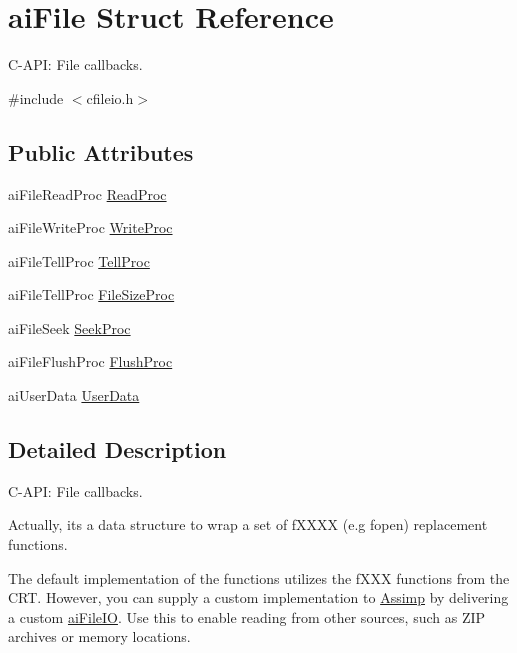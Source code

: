 \hypertarget{structai_file}{}\section{ai\+File Struct Reference}
\label{structai_file}


C-\/\+A\+PI\+: File callbacks.  




{\ttfamily \#include $<$cfileio.\+h$>$}

\subsection*{Public Attributes}
\begin{DoxyCompactItemize}
\item 
ai\+File\+Read\+Proc \hyperlink{structai_file_a52287e81ca67b9d43cc1ce6142f781fa}{Read\+Proc}
\item 
ai\+File\+Write\+Proc \hyperlink{structai_file_ab9fca3a62e34a33592c13a6f31db7d1d}{Write\+Proc}
\item 
ai\+File\+Tell\+Proc \hyperlink{structai_file_aaf2d88a3b2fcbdacf51119658283d27e}{Tell\+Proc}
\item 
ai\+File\+Tell\+Proc \hyperlink{structai_file_aff2fff8c0458e7ec71f7de217c3a3033}{File\+Size\+Proc}
\item 
ai\+File\+Seek \hyperlink{structai_file_a7a07b499be4ad433669246479a4d4ad2}{Seek\+Proc}
\item 
ai\+File\+Flush\+Proc \hyperlink{structai_file_a1102d28d1c0be68ffed20476669bdb0d}{Flush\+Proc}
\item 
ai\+User\+Data \hyperlink{structai_file_aec528fa18f4755fe4f28d604fde28aad}{User\+Data}
\end{DoxyCompactItemize}


\subsection{Detailed Description}
C-\/\+A\+PI\+: File callbacks. 

Actually, it\textquotesingle{}s a data structure to wrap a set of f\+X\+X\+XX (e.\+g fopen) replacement functions.

The default implementation of the functions utilizes the f\+X\+XX functions from the C\+RT. However, you can supply a custom implementation to \hyperlink{namespace_assimp}{Assimp} by delivering a custom \hyperlink{structai_file_i_o}{ai\+File\+IO}. Use this to enable reading from other sources, such as Z\+IP archives or memory locations. 

